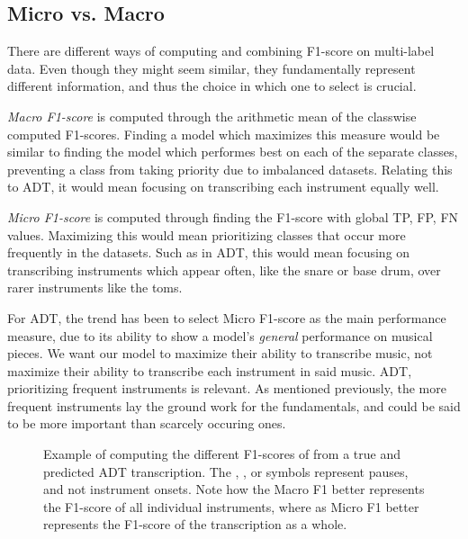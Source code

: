 \subsection{Micro vs. Macro}

There are different ways of computing and combining F1-score on multi-label data. Even though they might seem similar, they fundamentally represent different information, and thus the choice in which one to select is crucial.

\textit{Macro F1-score} is computed through the arithmetic mean of the classwise computed F1-scores. Finding a model which maximizes this measure would be similar to finding the model which performes best on each of the separate classes, preventing a class from taking priority due to imbalanced datasets. Relating this to \gls{ADT}, it would mean focusing on transcribing each instrument equally well.

\textit{Micro F1-score} is computed through finding the F1-score with global \gls{TP}, \gls{FP}, \gls{FN} values. Maximizing this would mean prioritizing classes that occur more frequently in the datasets. Such as in \gls{ADT}, this would mean focusing on transcribing instruments which appear often, like the snare or base drum, over rarer instruments like the toms.

For \gls{ADT}, the trend has been to select Micro F1-score as the main performance measure, due to its ability to show a model's \textit{general} performance on musical pieces. We want our model to maximize their ability to transcribe music, not maximize their ability to transcribe each instrument in said music. \gls{ADT}, prioritizing frequent instruments is relevant. As mentioned previously, the more frequent instruments lay the ground work for the fundamentals, and could be said to be more important than scarcely occuring ones.

\begin{figure}[H]
    \centering
    \hspace*{-0.5cm}
    
    \caption{Example of computing the different F1-scores of from a true and predicted \gls{ADT} transcription. The \HaPa, \ViPa, or \AcPa symbols represent pauses, and not instrument onsets. Note how the Macro F1 better represents the F1-score of all individual instruments, where as Micro F1 better represents the F1-score of the transcription as a whole.}
    \label{F1Figure}
\end{figure}
